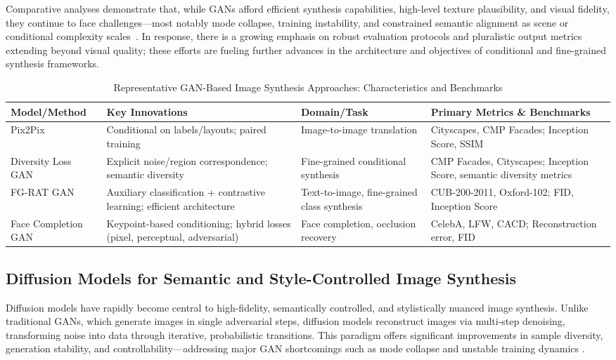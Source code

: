 \documentclass[sigconf]{acmart}
\begin{document}
Comparative analyses demonstrate that, while GANs afford efficient synthesis capabilities, high-level texture plausibility, and visual fidelity, they continue to face challenges---most notably mode collapse, training instability, and constrained semantic alignment as scene or conditional complexity scales~\cite{ref93,ref95,ref101,ref97}. In response, there is a growing emphasis on robust evaluation protocols and pluralistic output metrics extending beyond visual quality; these efforts are fueling further advances in the architecture and objectives of conditional and fine-grained synthesis frameworks.

\begin{table*}[htbp]
\centering
\caption{Representative GAN-Based Image Synthesis Approaches: Characteristics and Benchmarks}
\label{tab:gan_comparison}
\begin{adjustbox}{max width=\textwidth}
\begin{tabular}{@{}llll@{}}
\toprule
\textbf{Model/Method} & \textbf{Key Innovations} & \textbf{Domain/Task} & \textbf{Primary Metrics \& Benchmarks} \\
\midrule
Pix2Pix & Conditional on labels/layouts; paired training & Image-to-image translation & Cityscapes, CMP Facades; Inception Score, SSIM \\
Diversity Loss GAN & Explicit noise/region correspondence; semantic diversity & Fine-grained conditional synthesis & CMP Facades, Cityscapes; Inception Score, semantic diversity metrics \\
FG-RAT GAN & Auxiliary classification + contrastive learning; efficient architecture & Text-to-image, fine-grained class synthesis & CUB-200-2011, Oxford-102; FID, Inception Score \\
Face Completion GAN & Keypoint-based conditioning; hybrid losses (pixel, perceptual, adversarial) & Face completion, occlusion recovery & CelebA, LFW, CACD; Reconstruction error, FID \\
\bottomrule
\end{tabular}
\end{adjustbox}
\end{table*}

\subsection{Diffusion Models for Semantic and Style-Controlled Image Synthesis}

Diffusion models have rapidly become central to high-fidelity, semantically controlled, and stylistically nuanced image synthesis. Unlike traditional GANs, which generate images in single adversarial steps, diffusion models reconstruct images via multi-step denoising, transforming noise into data through iterative, probabilistic transitions. This paradigm offers significant improvements in sample diversity, generation stability, and controllability—addressing major GAN shortcomings such as mode collapse and unstable training dynamics \cite{ref76,ref90}.
\end{document}

